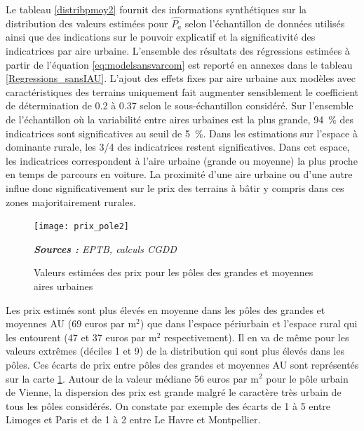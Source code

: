 \documentclass[10.5pt,a4paper]{article}
\begin{document}
{Le tableau \ref{distribpmoy2} fournit des informations synthétiques sur la distribution des valeurs estimées pour $\hat{P_{a}}$ selon l'échantillon de données utilisés ainsi que des indications sur le pouvoir explicatif et la significativité des indicatrices par aire urbaine. L'ensemble des résultats des régressions estimées à partir de l'équation \ref{eq:modelsansvarcom} est reporté en annexes dans le tableau \ref{Regressions_sansIAU}. 
L'ajout des effets fixes par aire urbaine aux modèles avec caractéristiques des terrains uniquement fait augmenter sensiblement le coefficient de détermination de 0.2 à 0.37 selon le sous-échantillon considéré. Sur l'ensemble de l'échantillon où la variabilité entre aires urbaines est la plus grande, 94~\% des indicatrices sont significatives au seuil de 5~\%. Dans les estimations sur l'espace à dominante rurale, les 3/4 des indicatrices restent significatives. Dans cet espace, les indicatrices correspondent à l'aire urbaine (grande ou moyenne) la plus proche en temps de parcours en voiture. La proximité d'une aire urbaine ou d'une autre influe donc significativement  sur le prix des terrains à bâtir y compris dans ces zones majoritairement rurales. \par  

\par  

\begin{figure}[!h]%
\begin{center}
\caption{Valeurs estimées des prix pour les pôles des grandes et moyennes aires urbaines \label{EFpole}}
\texttt{[image: prix\_pole2]}
\end{center}
\scriptsize \textit{\textbf{Sources :} EPTB, calculs CGDD}
\end{figure}

Les prix estimés sont plus élevés en moyenne dans les pôles des grandes et moyennes AU (69 euros par m$^2$) que dans l'espace périurbain et l'espace rural qui les entourent (47 et 37 euros par m$^2$ respectivement). Il en va de même pour les valeurs extrêmes (déciles 1 et 9) de la distribution qui sont plus élevés dans les pôles. Ces écarts de prix entre pôles des grandes et moyennes AU sont représentés sur la carte \ref{EFpole}. Autour de la valeur médiane 56 euros par m$^2$ pour le pôle urbain de Vienne, la dispersion des prix est grande malgré le caractère très urbain de tous les pôles considérés. On constate par exemple des écarts de 1 à 5 entre Limoges et Paris et de 1 à 2 entre Le Havre et Montpellier. \par  

}
\end{document}
